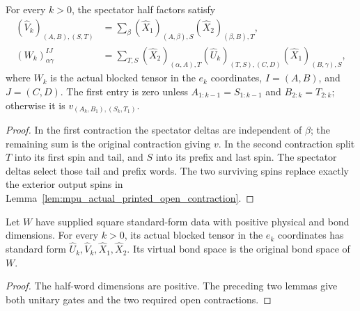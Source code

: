 \begin{lemma}
    \label{lem:mpu_printed_blocked_contractions}
    \leanok
    For every $k>0$, the spectator half factors satisfy
    \begin{align*}
        (\widehat V_k)_{(A,B),(S,T)}
         & =\sum_\beta (\widehat X_1)_{(A,\beta),S}
        (\widehat X_2)_{(\beta,B),T},               \\
        (W_k)^{IJ}_{\alpha\gamma}
         & =\sum_{T,S}(\widehat X_2)_{(\alpha,A),T}
        (\widehat U_k)_{(T,S),(C,D)}
        (\widehat X_1)_{(B,\gamma),S},
    \end{align*}
    where $W_k$ is the actual blocked tensor in the $e_k$ coordinates,
    $I=(A,B)$, and $J=(C,D)$. The first entry is zero unless
    $A_{1:k-1}=S_{1:k-1}$ and $B_{2:k}=T_{2:k}$; otherwise it is
    $v_{(A_k,B_1),(S_k,T_1)}$.
\end{lemma}
\begin{proof}\leanok
    In the first contraction the spectator deltas are independent of
    $\beta$; the remaining sum is the original contraction giving $v$.
    In the second contraction split $T$ into its first spin and tail,
    and $S$ into its prefix and last spin. The spectator deltas select
    those tail and prefix words. The two surviving spins replace exactly
    the exterior output spins in
    Lemma~\ref{lem:mpu_actual_printed_open_contraction}.
\end{proof}

\begin{lemma}
    \label{lem:mpu_actual_printed_blocked_standard_form}
    \leanok
    Let $W$ have supplied square standard-form data with positive physical
    and bond dimensions. For every $k>0$, its actual blocked tensor in
    the $e_k$ coordinates has standard form
    $\widehat U_k,\widehat V_k,\widehat X_1,\widehat X_2$.
    Its virtual bond space is the original bond space of $W$.
\end{lemma}
\begin{proof}\leanok
    The half-word dimensions are positive. The preceding two lemmas give
    both unitary gates and the two required open contractions.
\end{proof}

